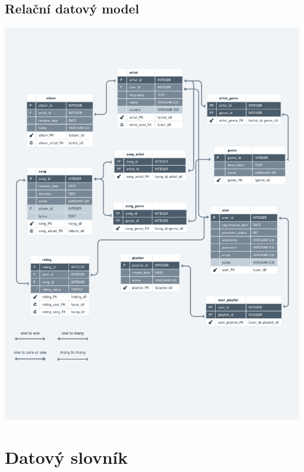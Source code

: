 \documentclass[czech,12pt,a4paper,titlepage]{article}
\begin{document}
    \subsection*{Relační datový model}
    \includegraphics[width=1\textwidth, center]{relacni_datovy_model}

    \clearpage

    \section*{Datový slovník}
    
\end{document}
